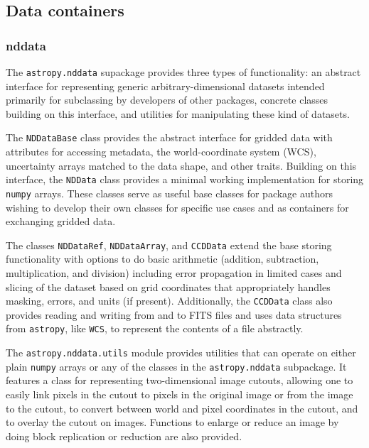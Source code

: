 \documentclass[modern]{aastex61}
\newcommand{\package}[1]{\texttt{#1}\xspace}
\newcommand{\astropypkg}{\package{astropy}}
\begin{document}
        


\subsection{Data containers}

\subsubsection{nddata}

The \package{astropy.nddata} supackage provides three types of functionality: an
abstract interface for representing generic arbitrary-dimensional datasets
intended primarily for subclassing by developers of other packages, concrete
classes building on this interface, and utilities for manipulating these kind of
datasets.

The \texttt{NDDataBase} class provides the abstract interface for gridded data
with attributes for accessing metadata, the world-coordinate system (WCS),
uncertainty arrays matched to the data shape, and other traits.
Building on this interface, the \texttt{NDData} class provides a minimal working implementation for storing \package{numpy} arrays. These classes serve as useful base classes for package authors wishing to develop their own classes for specific use cases and as containers for exchanging gridded data.

The classes \texttt{NDDataRef}, \texttt{NDDataArray}, and \texttt{CCDData} extend the base storing functionality with options to do basic arithmetic (addition, subtraction, multiplication, and division) including error propagation in limited cases and slicing of the dataset based on grid coordinates that appropriately handles masking, errors, and units (if present). Additionally, the \texttt{CCDData} class also provides reading and writing from and to FITS files and uses data structures from \astropypkg, like \texttt{WCS}, to represent the contents of a file abstractly.

The \package{astropy.nddata.utils} module provides utilities that can operate on either plain \package{numpy} arrays or any of the classes in the \package{astropy.nddata} subpackage. It features a class for representing two-dimensional image cutouts, allowing one to easily link pixels in the cutout to pixels in the original image or from the image to the cutout, to convert between world and pixel coordinates in the cutout, and to overlay the cutout on images. Functions to enlarge or reduce an image by doing block replication or reduction are also provided.
\end{document}
